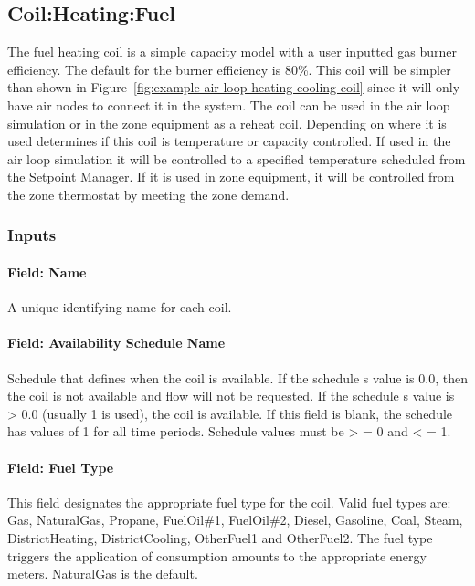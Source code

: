 \subsection{Coil:Heating:Fuel}\label{coilheatinggas-000}

The fuel heating coil is a simple capacity model with a user inputted gas burner efficiency. The default for the burner efficiency is 80\%. This coil will be simpler than shown in Figure~\ref{fig:example-air-loop-heating-cooling-coil} since it will only have air nodes to connect it in the system. The coil can be used in the air loop simulation or in the zone equipment as a reheat coil. Depending on where it is used determines if this coil is temperature or capacity controlled. If used in the air loop simulation it will be controlled to a specified temperature scheduled from the Setpoint Manager. If it is used in zone equipment, it will be controlled from the zone thermostat by meeting the zone demand.

\subsubsection{Inputs}\label{inputs-10-006}

\paragraph{Field: Name}\label{field-name-9-006}

A unique identifying name for each coil.

\paragraph{Field: Availability Schedule Name}\label{field-availability-schedule-name-4-003}

Schedule that defines when the coil is available. If the schedule s value is 0.0, then the coil is not available and flow will not be requested. If the schedule s value is \textgreater{} 0.0 (usually 1 is used), the coil is available. If this field is blank, the schedule has values of 1 for all time periods. Schedule values must be \textgreater{} = 0 and \textless{} = 1.

\paragraph{Field: Fuel Type}\label{field-gas-burner-efficiency}

This field designates the appropriate fuel type for the coil. Valid fuel types are: Gas, NaturalGas, Propane, FuelOil\#1, FuelOil\#2, Diesel, Gasoline, Coal, Steam, DistrictHeating, DistrictCooling, OtherFuel1 and OtherFuel2. The fuel type triggers the application of consumption amounts to the appropriate energy meters. NaturalGas is the default.

